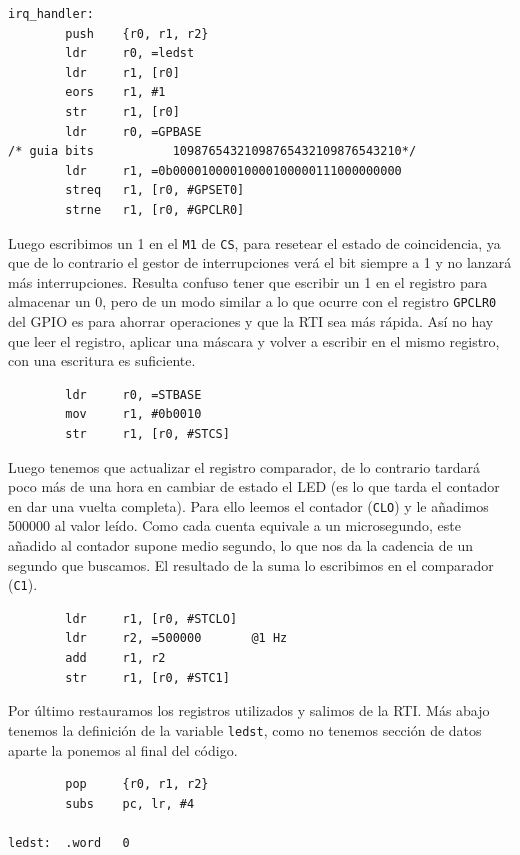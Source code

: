 \begin{lstlisting}
irq_handler:
        push    {r0, r1, r2}
        ldr     r0, =ledst
        ldr     r1, [r0]
        eors    r1, #1
        str     r1, [r0]
        ldr     r0, =GPBASE
/* guia bits           10987654321098765432109876543210*/
        ldr     r1, =0b00001000010000100000111000000000
        streq   r1, [r0, #GPSET0]
        strne   r1, [r0, #GPCLR0]
\end{lstlisting}

Luego escribimos un 1 en el {\tt M1} de {\tt CS}, para resetear el estado de coincidencia, ya
que de lo contrario el gestor de interrupciones verá el bit siempre a 1 y no lanzará más
interrupciones. Resulta confuso tener que escribir un 1 en el registro para almacenar un 0, pero
de un modo similar a lo que ocurre con el registro {\tt GPCLR0} del GPIO es para ahorrar
operaciones y que la RTI sea más rápida. Así no hay que leer el registro, aplicar una máscara y
volver a escribir en el mismo registro, con una escritura es suficiente.

\begin{lstlisting}
        ldr     r0, =STBASE
        mov     r1, #0b0010
        str     r1, [r0, #STCS]
\end{lstlisting}

Luego tenemos que actualizar el registro comparador, de lo contrario tardará poco más
de una hora en cambiar de estado el LED (es lo que tarda el contador en dar una vuelta
completa). Para ello leemos el contador ({\tt CLO}) y le añadimos 500000 al valor leído. Como cada
cuenta equivale a un microsegundo, este añadido al contador supone medio segundo, lo
que nos da la cadencia de un segundo que buscamos. El resultado de la suma lo escribimos
en el comparador ({\tt C1}).

\begin{lstlisting}
        ldr     r1, [r0, #STCLO]
        ldr     r2, =500000       @1 Hz
        add     r1, r2
        str     r1, [r0, #STC1]
\end{lstlisting}

Por último restauramos los registros utilizados y salimos de la RTI. Más abajo tenemos la
definición de la variable {\tt ledst}, como no tenemos sección de datos aparte la ponemos
al final del código.

\begin{lstlisting}
        pop     {r0, r1, r2}
        subs    pc, lr, #4

ledst:  .word   0
\end{lstlisting}

